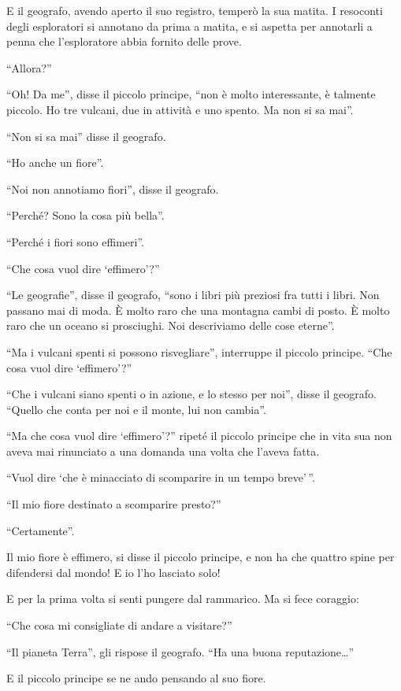 \documentclass[11pt]{scrbook}
\begin{document}
E il geografo, avendo aperto il suo registro, temperò la sua matita. I resoconti degli esploratori si annotano da prima a matita, e si aspetta per annotarli a penna che l'esploratore abbia fornito delle prove.

``Allora?''

``Oh! Da me'', disse il piccolo principe, ``non è molto interessante, è talmente piccolo. Ho tre vulcani, due in attività e uno spento. Ma non si sa mai''.

``Non si sa mai'' disse il geografo.

``Ho anche un fiore''.

``Noi non annotiamo fiori'', disse il geografo.

``Perché? Sono la cosa più bella''.

``Perché i fiori sono effimeri''.

``Che cosa vuol dire `effimero'?''

``Le geografie'', disse il geografo, ``sono i libri più preziosi fra tutti i libri. Non passano mai di moda. È molto raro che una montagna cambi di posto. È molto raro che un oceano si prosciughi. Noi descriviamo delle cose eterne''.

``Ma i vulcani spenti si possono risvegliare'', interruppe il piccolo principe. ``Che cosa vuol dire `effimero'?''

``Che i vulcani siano spenti o in azione, e lo stesso per noi'', disse il geografo. ``Quello che conta per noi e il monte, lui non cambia''.

``Ma che cosa vuol dire `effimero'?'' ripeté il piccolo principe che in vita sua non aveva mai rinunciato a una domanda una volta che l'aveva fatta.

``Vuol dire `che è minacciato di scomparire in un tempo breve'\,''.

``Il mio fiore destinato a scomparire presto?''

``Certamente''.

Il mio fiore è effimero, si disse il piccolo principe, e non ha che quattro spine per difendersi dal mondo! E io l'ho lasciato solo!

E per la prima volta si senti pungere dal rammarico. Ma si fece coraggio:

``Che cosa mi consigliate di andare a visitare?''

``Il pianeta Terra'', gli rispose il geografo. ``Ha una buona
reputazione\ldots{}''

E il piccolo principe se ne ando pensando al suo fiore.
\end{document}
